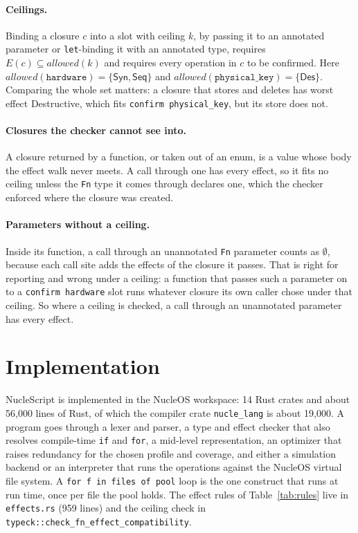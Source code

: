 \documentclass[11pt,a4paper]{article}
\newcommand{\Syn}{\mathsf{Syn}}
\newcommand{\Seq}{\mathsf{Seq}}
\newcommand{\Des}{\mathsf{Des}}
\newcommand{\allowed}{\mathit{allowed}}
\newcommand{\nsl}[1]{\texttt{#1}}
\begin{document}
\paragraph{Ceilings.} Binding a closure $c$ into a slot with ceiling $k$,
by passing it to an annotated parameter or \nsl{let}-binding it with an
annotated type, requires $E(c) \subseteq \allowed(k)$ and requires every
operation in $c$ to be confirmed. Here
$\allowed(\nsl{hardware}) = \{\Syn, \Seq\}$ and
$\allowed(\nsl{physical\_key}) = \{\Des\}$. Comparing the whole set matters: a closure that
stores and deletes has worst effect Destructive, which fits
\nsl{confirm physical\_key}, but its store does not.

\paragraph{Closures the checker cannot see into.} A closure returned by a
function, or taken out of an enum, is a value whose body the effect walk
never meets. A call through one has every effect, so it fits no ceiling
unless the \nsl{Fn} type it comes through declares one, which the checker
enforced where the closure was created.

\paragraph{Parameters without a ceiling.} Inside its function, a call
through an unannotated \nsl{Fn} parameter counts as $\emptyset$, because
each call site adds the effects of the closure it passes. That is right
for reporting and wrong under a ceiling: a function that passes such a
parameter on to a \nsl{confirm hardware} slot runs whatever closure its
own caller chose under that ceiling. So where a ceiling is checked, a
call through an unannotated parameter has every effect.

\section{Implementation}
\label{sec:impl}

NucleScript is implemented in the NucleOS workspace: 14 Rust crates and
about 56,000 lines of Rust, of which the compiler crate \nsl{nucle\_lang}
is about 19,000. A program goes through a lexer and parser, a type and
effect checker that also resolves compile-time \nsl{if} and \nsl{for}, a
mid-level representation, an optimizer that raises redundancy for the
chosen profile and coverage, and either a simulation backend or an
interpreter that runs the operations against the NucleOS virtual file
system. A \nsl{for f in files of pool} loop is the one construct that
runs at run time, once per file the pool holds. The effect rules of
Table~\ref{tab:rules} live in \nsl{effects.rs} (959 lines) and the
ceiling check in
\nsl{typeck::check\_fn\_effect\_compatibility}.
\end{document}
